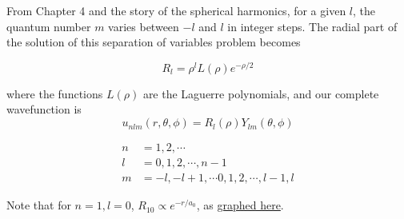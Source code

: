 From Chapter 4 and the story of the spherical harmonics, for a given $l$, the quantum number $m$ varies between $-l$ and $l$ in integer steps.  The radial part of the solution of this separation of variables problem becomes

\begin{equation}\label{eqn:PHY356FLecture10:320}
R_l = \rho^l L(\rho) e^{-\rho/2}
\end{equation}

where the functions $L(\rho)$ are the Laguerre polynomials, and our complete wavefunction is
\begin{equation}\label{eqn:PHY356FLecture10:330}
u_{nlm}(r, \theta, \phi) = R_l(\rho) Y_{lm}(\theta, \phi)
\end{equation}

\begin{align}\label{eqn:PHY356FLecture10:340}
n &= 1, 2, \cdots \\
l &= 0, 1, 2, \cdots, n-1 \\
m &= -l, -l+1, \cdots 0, 1, 2, \cdots, l-1, l
\end{align}

Note that for $n=1, l=0$, $R_{10} \propto e^{-r/a_0}$, as \href{http://www.wolframalpha.com/input/?i=graph+e^{-r}}{graphed here}.

